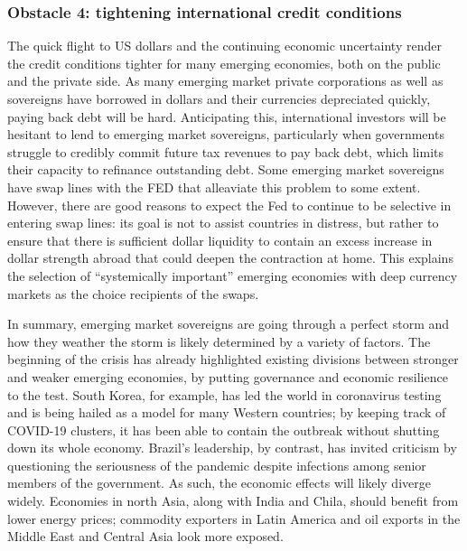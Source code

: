 \documentclass[11pt,]{article}
\begin{document}
\hypertarget{obstacle-4-tightening-international-credit-conditions}{%
\subsubsection{Obstacle 4: tightening international credit
conditions}\label{obstacle-4-tightening-international-credit-conditions}}

The quick flight to US dollars and the continuing economic uncertainty
render the credit conditions tighter for many emerging economies, both
on the public and the private side. As many emerging market private
corporations as well as sovereigns have borrowed in dollars and their
currencies depreciated quickly, paying back debt will be hard.
Anticipating this, international investors will be hesitant to lend to
emerging market sovereigns, particularly when governments struggle to
credibly commit future tax revenues to pay back debt, which limits their
capacity to refinance outstanding debt. Some emerging market sovereigns
have swap lines with the FED that alleaviate this problem to some
extent. However, there are good reasons to expect the Fed to continue to
be selective in entering swap lines: its goal is not to assist countries
in distress, but rather to ensure that there is sufficient dollar
liquidity to contain an excess increase in dollar strength abroad that
could deepen the contraction at home. This explains the selection of
``systemically important'' emerging economies with deep currency markets
as the choice recipients of the swaps.

In summary, emerging market sovereigns are going through a perfect storm
and how they weather the storm is likely determined by a variety of
factors. The beginning of the crisis has already highlighted existing
divisions between stronger and weaker emerging economies, by putting
governance and economic resilience to the test. South Korea, for
example, has led the world in coronavirus testing and is being hailed as
a model for many Western countries; by keeping track of COVID-19
clusters, it has been able to contain the outbreak without shutting down
its whole economy. Brazil's leadership, by contrast, has invited
criticism by questioning the seriousness of the pandemic despite
infections among senior members of the government. As such, the economic
effects will likely diverge widely. Economies in north Asia, along with
India and Chila, should benefit from lower energy prices; commodity
exporters in Latin America and oil exports in the Middle East and
Central Asia look more exposed.
\end{document}
